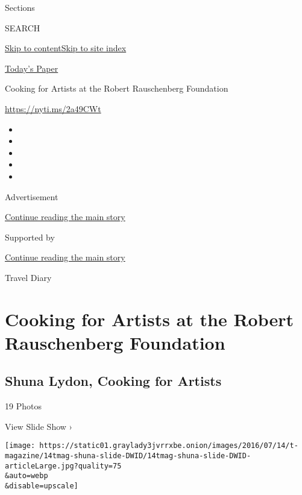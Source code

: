 Sections

SEARCH

\protect\hyperlink{site-content}{Skip to
content}\protect\hyperlink{site-index}{Skip to site index}

\href{https://myaccount.nytimes3xbfgragh.onion/auth/login?response_type=cookie\&client_id=vi}{}

\href{https://www.nytimes3xbfgragh.onion/section/todayspaper}{Today's
Paper}

Cooking for Artists at the Robert Rauschenberg Foundation

\url{https://nyti.ms/2a49CWt}

\begin{itemize}
\item
\item
\item
\item
\item
\end{itemize}

Advertisement

\protect\hyperlink{after-top}{Continue reading the main story}

Supported by

\protect\hyperlink{after-sponsor}{Continue reading the main story}

Travel Diary

\hypertarget{cooking-for-artists-at-the-robert-rauschenberg-foundation}{%
\section{Cooking for Artists at the Robert Rauschenberg
Foundation}\label{cooking-for-artists-at-the-robert-rauschenberg-foundation}}

\href{https://www.nytimes3xbfgragh.onion/slideshow/2016/07/14/t-magazine/shuna-lydon-cooking-for-artists.html}{}

\hypertarget{shuna-lydon-cooking-for-artists}{%
\subsection{Shuna Lydon, Cooking for
Artists}\label{shuna-lydon-cooking-for-artists}}

19 Photos

View Slide Show ›

\texttt{[image: https://static01.graylady3jvrrxbe.onion/images/2016/07/14/t-magazine/14tmag-shuna-slide-DWID/14tmag-shuna-slide-DWID-articleLarge.jpg?quality=75\\\&auto=webp\\\&disable=upscale]}


